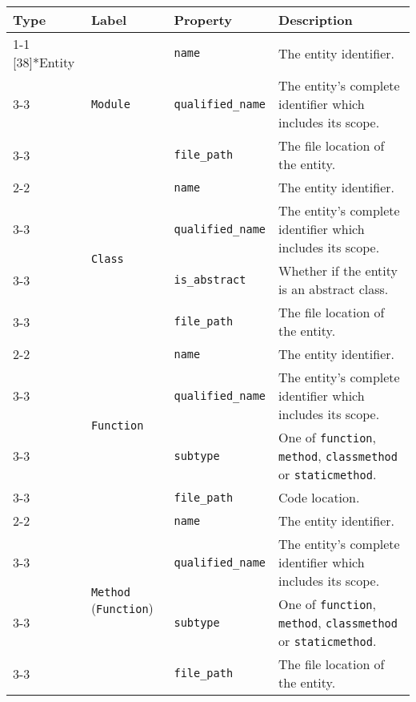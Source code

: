 \begin{tabularx}{\textwidth}{p{1.8cm}llX}
\toprule
\textbf{Type} & \textbf{Label} & \textbf{Property} & \textbf{Description} \\
\cmidrule{1-1}\cmidrule{2-2}\cmidrule{3-3}\cmidrule{4-4}
\multirow{19}[38]{*}{Entity} & \multirow{3}[6]{*}{\texttt{Module}} & \texttt{name} & The entity identifier. \\
\cmidrule{3-3}\cmidrule{4-4}
 &  & \texttt{qualified\_\texttt{name}} & The entity's complete identifier which includes its scope. \\
\cmidrule{3-3}\cmidrule{4-4}
 &  & \texttt{file\_path} & The file location of the entity. \\
\cmidrule{2-2}\cmidrule{3-3}\cmidrule{4-4}
 & \multirow{4}[8]{*}{\texttt{Class}} & \texttt{name} & The entity identifier. \\
\cmidrule{3-3}\cmidrule{4-4}
 &  & \texttt{qualified\_\texttt{name}} & The entity's complete identifier which includes its scope. \\
\cmidrule{3-3}\cmidrule{4-4}
 &  & \texttt{is\_abstract} & Whether if the entity is an abstract class. \\
\cmidrule{3-3}\cmidrule{4-4}
 &  & \texttt{file\_path} & The file location of the entity. \\
\cmidrule{2-2}\cmidrule{3-3}\cmidrule{4-4}
 & \multirow{4}[8]{*}{\texttt{Function}} & \texttt{name} & The entity identifier. \\
\cmidrule{3-3}\cmidrule{4-4}
 &  & \texttt{qualified\_\texttt{name}} & The entity's complete identifier which includes its scope. \\
\cmidrule{3-3}\cmidrule{4-4}
 &  & \texttt{subtype} & One of \texttt{function}, \texttt{method}, \texttt{class\texttt{method}} or \texttt{static\texttt{method}}. \\
\cmidrule{3-3}\cmidrule{4-4}
 &  & \texttt{file\_path} & Code location. \\
\cmidrule{2-2}\cmidrule{3-3}\cmidrule{4-4}
 & \multirow{4}[8]{*}{\texttt{Method} (\texttt{Function})} & \texttt{name} & The entity identifier. \\
\cmidrule{3-3}\cmidrule{4-4}
 &  & \texttt{qualified\_\texttt{name}} & The entity's complete identifier which includes its scope. \\
\cmidrule{3-3}\cmidrule{4-4}
 &  & \texttt{subtype} & One of \texttt{function}, \texttt{method}, \texttt{class\texttt{method}} or \texttt{static\texttt{method}}. \\
\cmidrule{3-3}\cmidrule{4-4}
 &  & \texttt{file\_path} & The file location of the entity. \\

\end{tabularx}
